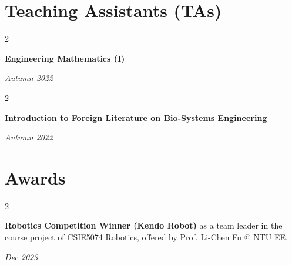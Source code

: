 \documentclass[10pt, letterpaper]{article}
\newenvironment{twocolentry}[2][]{
    \onecolentry
    \def\secondColumn{#2}
    \setcolumnwidth{\fill, 4.5 cm}
    \begin{paracol}{2}
}{
    \switchcolumn \raggedleft \secondColumn
    \end{paracol}
    \endonecolentry
} %
\begin{document}
    \section{Teaching Assistants (TAs)}
    
        \begin{twocolentry}{
        \textit{Autumn 2022}}
            \textbf{Engineering Mathematics (I)}
        \end{twocolentry}

        \vspace{0.2 cm}

        \begin{twocolentry}{
        \textit{Autumn 2022}}
            \textbf{Introduction to Foreign Literature on Bio-Systems Engineering}
        \end{twocolentry}
        
    \section{Awards}
    
        \begin{twocolentry}{
        \textit{Dec 2023}}
            \textbf{Robotics Competition Winner (Kendo Robot)} as a team leader in the course project of CSIE5074 Robotics, offered by Prof. Li-Chen Fu @ NTU EE.
        \end{twocolentry}
\end{document}
